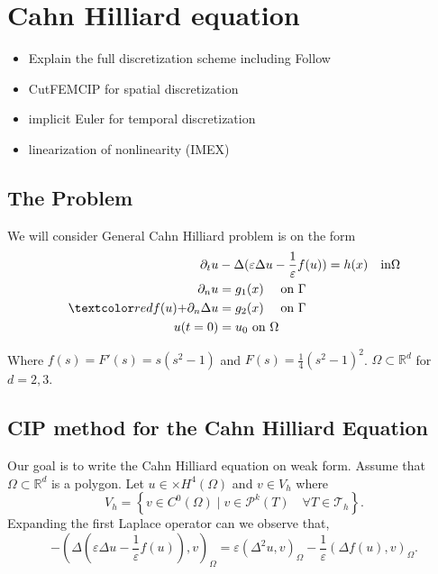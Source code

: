 
\newpage
\section{Cahn Hilliard equation }%
\label{sec:cahn_hilliard_equation}


\begin{itemize}
    \item Explain the full discretization scheme including Follow \cite{feng2007fully}
    \item CutFEMCIP for spatial discretization
    \item implicit Euler for temporal discretization
    \item linearization of nonlinearity (IMEX)
\end{itemize}


\subsection{The Problem}%
\label{sub:the_problem}

We will consider General Cahn Hilliard problem is on the form
\begin{equation}
\label{eq:ch_exact}
    \begin{split}
        \partial _{t} u & - \Delta ( \varepsilon  \Delta u - \frac{1}{\varepsilon } f( u) ) =  h(x)  \quad \text{in} \Omega \\
        \partial _{n} u & =  g_{1}(x)  \quad \text{ on } \Gamma \\
        \red{ f( u) +}  \partial _{n} \Delta u & = g_{2}(x)  \quad \text{ on } \Gamma  \\
        u(t=0) & = u_{0}   \text{ on } \Omega
    \end{split}
\end{equation}

Where $f( s)  = F' ( s)=s( s^2 -1)  $ and $F( s)  = \frac{1}{4} ( s^2 - 1)^2 $. $\Omega \subset \mathbb{R} ^{d} $  for $d = 2,3$.



\subsection{ CIP method for the Cahn Hilliard Equation}%
\label{sub:writing_the_cahn_hilliard_equation_of_weak_form}

Our goal is to write the Cahn Hilliard equation on weak form.
Assume that $\Omega  \subset \mathbb{R} ^{d}$ is a polygon.
 Let $u \in \times H^{4}( \Omega ) $ and $v \in V_{h} $ where
\[
V_{h} = \left\{ v \in C^{0}( \Omega )   \mid v\in \mathcal{P} ^{k} ( T) \quad \forall T \in \mathcal{T} _{h} \right\}.
\]
Expanding the first Laplace operator can we observe that,
\[
- ( \Delta ( \varepsilon  \Delta u - \frac{1}{\varepsilon } f( u) ) ,v )_{\Omega } = \varepsilon ( \Delta^{2} u ,v )_{\Omega } - \frac{1}{\varepsilon } ( \Delta f( u)  ,v )_{\Omega }.
\]

